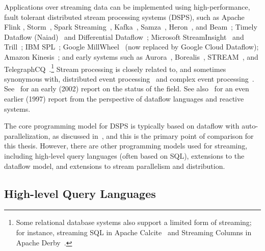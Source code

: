 Applications over streaming data can be implemented using
high-performance, fault tolerant distributed stream processing systems (DSPS), such as
Apache
Flink \cite{Flink2015,Flink2017,Flink},
Storm~\cite{Storm,StormConcepts},
Spark Streaming~\cite{Spark2013,SparkStreaming},
Kafka~\cite{garg2013apache},
Samza~\cite{Samza2017},
Heron~\cite{kulkarni2015twitter-heron,Heron},
and Beam~\cite{Beam};
Timely Dataflow (Naiad)~\cite{Naiad2013,Timely}
and
Differential Dataflow~\cite{mcsherry2013differential};
Microsoft
StreamInsight~\cite{ACGS2011SI}
and Trill~\cite{chandramouli2014trill};
IBM SPL~\cite{HAG2013SPL};
Google MillWheel~\cite{MillWheel} (now replaced by Google Cloud Dataflow);
Amazon Kinesis~\cite{AmazonKinesis};
and early systems such as
Aurora~\cite{Aurora,AuroraWeb},
Borealis~\cite{Borealis,BorealisWeb},
STREAM~\cite{STREAM2004},
and TelegraphCQ~\cite{Telegraph}.\footnote{
  Some relational database systems also support a limited form of streaming;
  for instance, streaming SQL in Apache Calcite~\cite{begoli2018apache,CalciteStreaming} and Streaming Columns in Apache Derby~\cite{DerbyStreaming}.
}
Stream processing is closely related to,
and sometimes synonymous with,
distributed event processing~\cite{DEBS2006}
and complex event processing~\cite{CEP2006}.
See~\cite{babcock2002models} for an early (2002) report on the status of the field.
See also~\cite{stephens1997survey} for an even earlier (1997) report from the perspective of dataflow languages and reactive systems.

The core programming model for DSPS is typically based on dataflow with auto-parallelization, as discussed in~,
and this is the primary point of comparison for this thesis.
However, there are other programming models used for streaming, including
high-level query languages (often based on SQL),
extensions to the dataflow model,
and extensions to stream parallelism and distribution.

\subsection{High-level Query Languages}

